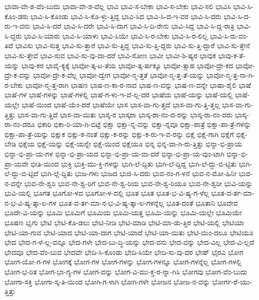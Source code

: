 {ಭಾವಾ-ವೇ-ಶ-ವೆಂ-ಬುದು
ಭಾವಾ-ವೇ-ಶ-ವೆಲ್ಲ
ಭಾವಿ
ಭಾವಿ-ಸ-ಬೇಕಾ
ಭಾವಿ-ಸ-ಬೇಕು
ಭಾವಿ-ಸಲಿ
ಭಾವಿಸಿ
ಭಾವಿ-ಸಿ-ಕೊಂ-ಡರು
ಭಾವಿ-ಸಿ-ಕೊಂಡು
ಭಾವಿ-ಸಿ-ಕೊ-ಳ್ಳು-ತ್ತಿದ್ದ
ಭಾವಿ-ಸಿದ
ಭಾವಿ-ಸಿ-ದ-ಇ-ವರ
ಭಾವಿ-ಸಿ-ದರು
ಭಾವಿ-ಸಿ-ದ-ರು-ಇ-ವನು
ಭಾವಿ-ಸಿ-ದರೆ
ಭಾವಿ-ಸಿ-ದರೇ
ಭಾವಿ-ಸಿ-ದಾಗ
ಭಾವಿ-ಸಿ-ದಿ-ರೇನು
ಭಾವಿ-ಸಿದ್ದ
ಭಾವಿ-ಸಿ-ದ್ದ-ರಾತ್ರಿ
ಭಾವಿ-ಸಿ-ದ್ದರು
ಭಾವಿ-ಸಿ-ಯಾರು
ಭಾವಿ-ಸಿ-ಯಾಳು
ಭಾವಿ-ಸಿಯೇ
ಭಾವಿ-ಸಿ-ರ-ಬೇಕು
ಭಾವಿ-ಸಿ-ರ-ಲಿಲ್ಲ
ಭಾವಿ-ಸಿ-ರು-ವಂ-ತಿದೆ
ಭಾವಿಸು
ಭಾವಿ-ಸುತ್ತ
ಭಾವಿ-ಸು-ತ್ತಾರೆ
ಭಾವಿ-ಸು-ತ್ತಿದ್ದ
ಭಾವಿ-ಸು-ತ್ತಿ-ದ್ದರು
ಭಾವಿ-ಸು-ತ್ತಿ-ದ್ದಾರೆ
ಭಾವಿ-ಸು-ತ್ತೇನೆ
ಭಾವಿ-ಸು-ತ್ತೇವೆ
ಭಾವಿ-ಸುವ
ಭಾವಿ-ಸು-ವು-ದಾ-ದರೆ
ಭಾವಿ-ಸೋಣ
ಭಾವೀ
ಭಾವೀ-ಶಿ-ಷ್ಯರ
ಭಾವುಕ
ಭಾವು-ಕ-ತೆ-ಯನ್ನು
ಭಾವು-ಕರ
ಭಾವೈ-ಕ್ಯಕ್ಕೆ
ಭಾವೋ-ತ್ಕ-ಟ-ತೆಯ
ಭಾವೋ-ತ್ಕ-ರ್ಷಕ್ಕೂ
ಭಾವೋ-ತ್ಸಾಹ
ಭಾವೋ-ದ್ರೇ-ಕದ
ಭಾವೋ-ದ್ರೇ-ಕ-ವನ್ನು
ಭಾವೋ-ದ್ರೇ-ಕ-ವೆಲ್ಲ
ಭಾವೋ-ದ್ವೇಗ
ಭಾವೋ-ನ್ಮ-ತ್ತತೆ
ಭಾವೋ-ನ್ಮ-ತ್ತ-ತೆ-ಯನ್ನು
ಭಾವೋ-ನ್ಮ-ತ್ತ-ನಾ-ಗಿ-ರ-ಬೇಕು
ಭಾವೋ-ನ್ಮ-ತ್ತ-ರಾಗಿ
ಭಾಷಣ
ಭಾಷ-ಣ-ಕಾ-ರ-ನಾದ
ಭಾಷ-ಣ-ವನ್ನು
ಭಾಷ-ಣ-ವನ್ನೇ
ಭಾಷಾ-ಶೈಲಿ
ಭಾಷೆ
ಭಾಷೆ-ಗಳ
ಭಾಷೆ-ಗಳನ್ನು
ಭಾಷೆ-ಗಳಲ್ಲಿ
ಭಾಷೆ-ಗ-ಳು-ಇ-ವೆ-ಲ್ಲ-ದರ
ಭಾಷೆಯ
ಭಾಷೆ-ಯನ್ನು
ಭಾಷೆ-ಯಲ್ಲಿ
ಭಾಷೆ-ಯಲ್ಲೇ
ಭಾಷೆ-ಯಿಂದ
ಭಾಷೆ-ಯೆಂ-ದರೆ
ಭಾಷೆಯೇ
ಭಾಸ
ಭಾಸ-ವಾ-ಗು-ತ್ತದೆ
ಭಾಸ-ವಾ-ಗು-ತ್ತಿ-ತ್ತಲ್ಲ
ಭಾಸ-ವಾ-ಗು-ತ್ತಿತ್ತು
ಭಾಸ-ವಾ-ಗು-ತ್ತಿದೆ
ಭಾಸ-ವಾ-ಯಿತು
ಭಾಸ್ಕ-ರ
ಭಾಸ್ಕರಾ
ಭಾಸ್ಕ-ರಾ-ನಂ-ದ-ರನ್ನು
ಭಾಸ್ಕ-ರಾ-ನಂ-ದರು
ಭಾಸ್ಕ-ರಾ-ನಂ-ದರೂ
ಭಿಕಾರಿ
ಭಿಕಾ-ರಿ-ಯಾ-ಗಿ-ಬಿಟ್ಟೆ
ಭಿಕ್ಷಾ
ಭಿಕ್ಷಾ-ನ್ನ-ವನ್ನು
ಭಿಕ್ಷಾ-ನ್ನವೂ
ಭಿಕ್ಷಾ-ಪಾತ್ರೆ
ಭಿಕ್ಷಾ-ಪಾ-ತ್ರೆ-ಗಳನ್ನು
ಭಿಕ್ಷಾ-ಪಾ-ತ್ರೆ-ಯನ್ನು
ಭಿಕ್ಷುಕ
ಭಿಕ್ಷು-ಕ-ನಂತೆ
ಭಿಕ್ಷು-ಕ-ರನ್ನು
ಭಿಕ್ಷು-ಕ-ರು-ಇ-ವ-ರನ್ನು
ಭಿಕ್ಷೆ
ಭಿಕ್ಷೆ-ಗಾಗಿ
ಭಿಕ್ಷೆಗೆ
ಭಿಕ್ಷೆ-ಬೇಡಿ
ಭಿಕ್ಷೆಯ
ಭಿಕ್ಷೆ-ಯನ್ನು
ಭಿಕ್ಷೆ-ಯನ್ನೇ
ಭಿಕ್ಷೆ-ಯಿಂದ
ಭಿಕ್ಷೆಯೂ
ಭಿನ್ನ
ಭಿನ್ನ-ವಾ-ಗಿ-ರು-ತ್ತಿತ್ತು
ಭಿನ್ನಾ-ಭಿ-ಪ್ರಾಯ
ಭಿನ್ನಾ-ಭಿ-ಪ್ರಾ-ಯ-ಗಳ
ಭಿನ್ನಾ-ಭಿ-ಪ್ರಾ-ಯದ
ಭಿನ್ನಾ-ಭಿ-ಪ್ರಾ-ಯ-ವಾ-ದರೆ
ಭಿನ್ನಾ-ಭಿ-ಪ್ರಾ-ಯ-ವುಂ-ಟಾಗಿ
ಭಿನ್ನಾ-ಭಿ-ಪ್ರಾ-ಯವೇ
ಭೀತಿ-ಯಿಂದ
ಭುಕ್ತಿ
ಭುಕ್ತಿ-ಮು-ಕ್ತಿ-ಗಳನ್ನು
ಭುಗಿ-ಲೆ-ದ್ದಿತು
ಭುಗಿ-ಲೆ-ದ್ದಿದ್ದ
ಭುಗಿ-ಲೆ-ದ್ದು-ಬಿ-ಟ್ಟಿತು
ಭುಗಿ-ಲೆ-ದ್ದು-ಬಿ-ಟ್ಟಿದೆ
ಭುಗಿ-ಲ್ಲೆ-ದ್ದಿತು
ಭುಜ-ಗಳು
ಭುಜದ
ಭುಜಿ-ಸಿ-ದರು
ಭುವ-ನಂ-ಗ-ಳನೆ
ಭುವ-ನ-ಮೋ-ಹಿನೀ
ಭುವ-ನ-ವನ್ನೇ
ಭುವ-ನೇ-ಶ್ವರಿ
ಭುವ-ನೇ-ಶ್ವ-ರಿಗೆ
ಭುವ-ನೇ-ಶ್ವ-ರಿಯ
ಭುವ-ನೇ-ಶ್ವ-ರಿಯೂ
ಭುವ-ನೇ-ಶ್ವರೀ
ಭುವಿ-ಯನ್ನು
ಭುವಿ-ಯಲ್ಲಿ
ಭೂಗತ
ಭೂಗೋ-ಳದ
ಭೂಗೋ-ಳ-ದಲ್ಲಿ
ಭೂತ
ಭೂತ
ಭೂತ-ಭ-ವಿ-ಷ್ಯ-ಗ-ಳೆಲ್ಲ
ಭೂತ-ವ-ರ್ತ-ಮಾ-ನ-ಭ-ವಿ-ಷ್ಯ-ತ್ಕಾ-ಲ-ಗಳ
ಭೂತ-ವ-ರ್ತ-ಮಾ-ನ-ಭ-ವಿ-ಷ್ಯ-ತ್ಕಾ-ಲ-ಗಳನ್ನೆಲ್ಲ
ಭೂತ-ದಂತೆ
ಭೂತಾನಿ
ಭೂದೇವ
ಭೂದೇ-ವಿ-ಯನ್ನು
ಭೂಮಿ
ಭೂಮಿಗೆ
ಭೂಮಿಯ
ಭೂಮಿ-ಯತ್ತ
ಭೂಮಿ-ಯನ್ನು
ಭೂಮಿ-ಯಲ್ಲೇ
ಭೂಮಿಯೇ
ಭೂಷಣ
ಭೃಗು
ಭೇಟಿ
ಭೇಟಿ-ಕೊ-ಡಲು
ಭೇಟಿ-ನೀಡಿ
ಭೇಟಿ-ಮಾಡಿ
ಭೇಟಿ-ಮಾ-ಡು-ತ್ತಿರ
ಭೇಟಿ-ಯಲ್ಲಿ
ಭೇಟಿಯಾ
ಭೇಟಿ-ಯಾ-ಗುವ
ಭೇಟಿ-ಯಾದ
ಭೇಟಿ-ಯಾ-ದಾಗ
ಭೇಟಿ-ಯಾದೆ
ಭೇಟಿ-ಯಾ-ಯಿತು
ಭೇಟಿ-ಯಿಂ-ದಲೂ
ಭೇಟಿಯೂ
ಭೇದ
ಭೇದ-ಗ-ಳೆ-ಲ್ಲ-ವನ್ನೂ
ಭೇದ-ಗಳೇ
ಭೇದ-ಬು-ದ್ಧಿ-ಯನ್ನು
ಭೇದ-ವನು
ಭೇದ-ವನ್ನು
ಭೇದ-ವಿಲ್ಲ
ಭೇದ-ವಿ-ಲ್ಲದೆ
ಭೇದವೂ
ಭೇದ-ವೆಂ-ಬುವ
ಭೇದವೇ
ಭೇದಿ-ಸಿ-ಕೊಂಡು
ಭೇದಿ-ಸಿಯೇ
ಭೇದಿ-ಸು-ವು-ದರ
ಭೇಷ್
ಭೈರವಿ
ಭೋಗ
ಭೋಗ-ಯೋ-ಗ-ಗಳ
ಭೋಗಕ್ಕೆ
ಭೋಗ-ಗಳ
ಭೋಗ-ಗಳನ್ನು
ಭೋಗ-ಗಳನ್ನೂ
ಭೋಗ-ಗಳನ್ನೆಲ್ಲ
ಭೋಗ-ಗಳಲ್ಲಿ
ಭೋಗ-ಭ-ರಿತ
ಭೋಗ-ಭಾ-ಗ್ಯ-ಗಳ
ಭೋಗ-ವನ್ನು
ಭೋಗ-ವಿ-ಮು-ಕ್ತ-ರ-ನ್ನಾ-ಗಿಸಿ
ಭೋಗವು
ಭೋಗ-ವೆಂ-ಬುದು
ಭೋಗಾ-ಸಕ್ತಿ
ಭೋಗಾ-ಸ್ಕ-ತಿ-ಯಿಂದ
ಭೋಗಿ-ಗ-ಳಾಗಿ
ಭೋಗಿ-ಗಳೇ
ಭೋಜನ
ಭೋಜ-ನ-ವನ್ನು
ಭೋರ್ಗ-ರೆ-ಯು-ತ್ತಿತ್ತು
}
